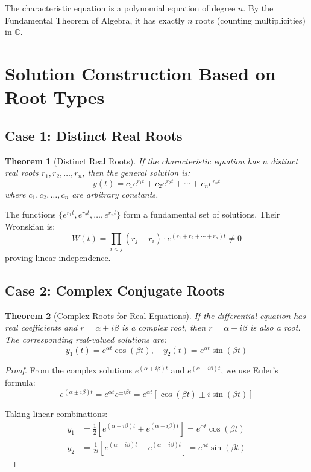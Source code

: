 \documentclass[12pt]{article}
\newtheorem{theorem}{Theorem}
\begin{document}
\begin{keypoint}
The characteristic equation is a polynomial equation of degree $n$. By the Fundamental Theorem of Algebra, it has exactly $n$ roots (counting multiplicities) in $\mathbb{C}$.
\end{keypoint}

\section{Solution Construction Based on Root Types}

\subsection{Case 1: Distinct Real Roots}

\begin{theorem}[Distinct Real Roots]
If the characteristic equation has $n$ distinct real roots $r_1, r_2, \ldots, r_n$, then the general solution is:
$$y(t) = c_1 e^{r_1 t} + c_2 e^{r_2 t} + \cdots + c_n e^{r_n t}$$
where $c_1, c_2, \ldots, c_n$ are arbitrary constants.
\end{theorem}

\begin{insight}
The functions $\{e^{r_1 t}, e^{r_2 t}, \ldots, e^{r_n t}\}$ form a fundamental set of solutions. Their Wronskian is:
$$W(t) = \prod_{i<j} (r_j - r_i) \cdot e^{(r_1 + r_2 + \cdots + r_n)t} \neq 0$$
proving linear independence.
\end{insight}

\subsection{Case 2: Complex Conjugate Roots}

\begin{theorem}[Complex Roots for Real Equations]
If the differential equation has real coefficients and $r = \alpha + i\beta$ is a complex root, then $\bar{r} = \alpha - i\beta$ is also a root. The corresponding real-valued solutions are:
$$y_1(t) = e^{\alpha t} \cos(\beta t), \quad y_2(t) = e^{\alpha t} \sin(\beta t)$$
\end{theorem}

\begin{proof}
From the complex solutions $e^{(\alpha + i\beta)t}$ and $e^{(\alpha - i\beta)t}$, we use Euler's formula:
$$e^{(\alpha \pm i\beta)t} = e^{\alpha t} e^{\pm i\beta t} = e^{\alpha t}[\cos(\beta t) \pm i\sin(\beta t)]$$

Taking linear combinations:
\begin{align}
y_1 &= \frac{1}{2}[e^{(\alpha + i\beta)t} + e^{(\alpha - i\beta)t}] = e^{\alpha t}\cos(\beta t) \\
y_2 &= \frac{1}{2i}[e^{(\alpha + i\beta)t} - e^{(\alpha - i\beta)t}] = e^{\alpha t}\sin(\beta t)
\end{align}
\end{proof}
\end{document}
